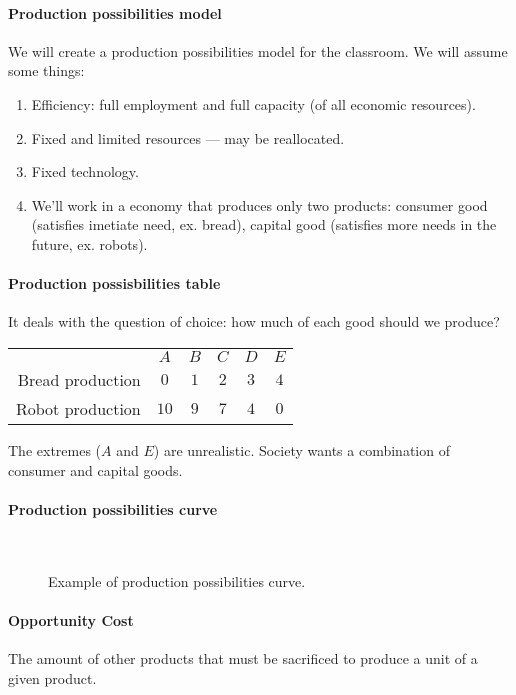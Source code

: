 \paragraph{Production possibilities model}
We will create a production possibilities model for the classroom. We will assume some things:
\begin{enumerate}[label = \textbullet]
	\item Efficiency: full employment and full capacity (of all economic resources).
	\item Fixed and limited resources --- may be reallocated.
	\item Fixed technology.
	\item We'll work in a economy that produces only two products: consumer good (satisfies imetiate need, ex. bread), capital good (satisfies more needs in the future, ex. robots).
\end{enumerate}

\paragraph{Production possisbilities table} It deals with the question of choice: how much of each good should we produce?

\begin{center}
\begin{tabular}{rccccc}
					 & $A$  & $B$ & $C$ & $D$ & $E$ \\
	Bread production & $0$  & $1$ & $2$ & $3$ & $4$ \\
	Robot production & $10$ & $9$ & $7$ & $4$ & $0$
\end{tabular}
\end{center}

The extremes ($A$ and $E$) are unrealistic. Society wants a combination of consumer and capital goods.

\paragraph{Production possibilities curve} \ 


\begin{figure}[ht]
	\centering
	\caption{Example of production possibilities curve.}
\end{figure}


\paragraph{Opportunity Cost} The amount of other products that must be sacrificed to produce a unit of a given product.

